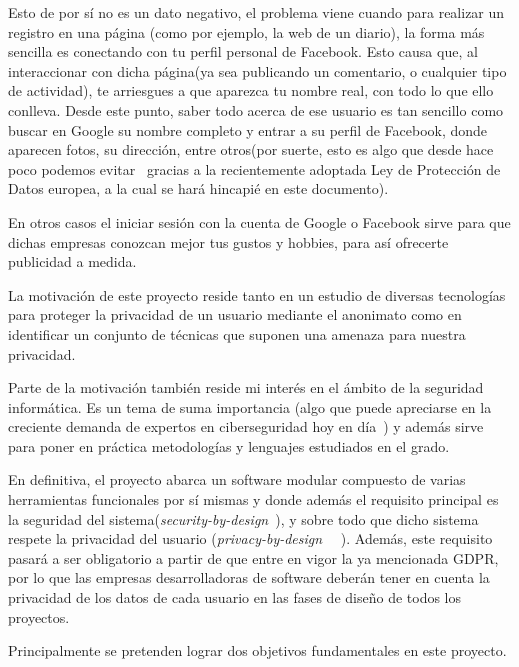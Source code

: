 Esto de por sí no es un dato negativo, el problema viene cuando para realizar un registro en una página (como por ejemplo, la web de un diario), la forma más sencilla es conectando con tu perfil personal de Facebook. Esto causa que, al interaccionar con dicha página(ya sea publicando un comentario, o cualquier tipo de actividad), te arriesgues a que aparezca tu nombre real, con todo lo que ello conlleva. Desde este punto, saber todo acerca de ese usuario es tan sencillo como buscar en Google su nombre completo y entrar a su perfil de Facebook, donde aparecen fotos, su dirección, entre otros(por suerte, esto es algo que desde hace poco podemos evitar~\cite{article:GDPRGoogle} gracias a la recientemente adoptada Ley de Protección de Datos europea, a la cual se hará hincapié en este documento).

En otros casos el iniciar sesión con la cuenta de Google o Facebook sirve para que dichas empresas conozcan mejor tus gustos y hobbies, para así ofrecerte publicidad a medida. 

La motivación de este proyecto reside tanto en un estudio de diversas tecnologías para proteger la privacidad de un usuario mediante el anonimato como en identificar un conjunto de técnicas que suponen una amenaza para nuestra privacidad.
 
Parte de la motivación también reside mi interés en el ámbito de la seguridad informática. Es un tema de suma importancia (algo que puede apreciarse en la creciente demanda de expertos en ciberseguridad hoy en día~\cite{article:expCiberseguridad}) y además sirve para poner en práctica metodologías y lenguajes estudiados en el grado. 

En definitiva, el proyecto  abarca un software modular compuesto de varias herramientas funcionales por sí mismas y donde además el requisito principal es la seguridad del sistema(\textit{security-by-design}~\cite{paper:secbydesign}), y sobre todo que dicho sistema respete la privacidad del usuario (\textit{privacy-by-design}~\cite{paper:privacybydesign} ~\cite{cavoukian2009privacy}). Además, este requisito pasará a ser obligatorio a partir de que entre en vigor la ya mencionada GDPR, por lo que las empresas desarrolladoras de software deberán tener en cuenta la privacidad de los datos de cada usuario en las fases de diseño de todos los proyectos.



Principalmente se pretenden lograr dos objetivos fundamentales en este proyecto.

